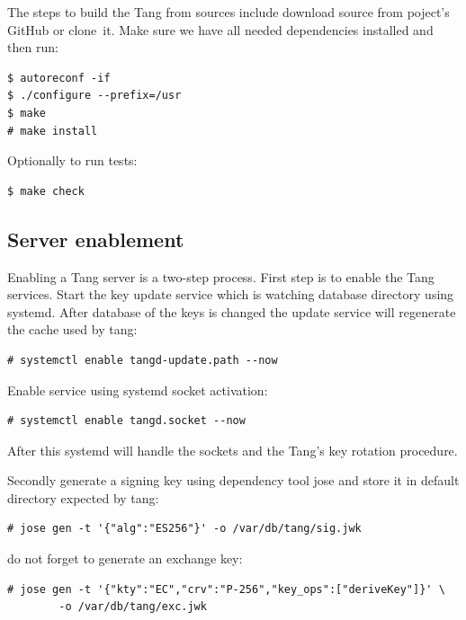 The steps to build the Tang from sources include download source from poject's GitHub or clone~it.
Make sure we have all needed dependencies installed and then run:
\begin{lstlisting}[columns=fixed,basicstyle=\ttfamily\footnotesize,tabsize=4,backgroundcolor=\color{yellow!10}]
$ autoreconf -if
$ ./configure --prefix=/usr
$ make
# make install
\end{lstlisting}
Optionally to run tests:
\begin{lstlisting}[columns=fixed,basicstyle=\ttfamily\footnotesize,tabsize=4,backgroundcolor=\color{yellow!10}]
$ make check
\end{lstlisting}



\subsection{Server enablement}

Enabling a Tang server is a two-step process.
First step is to enable the Tang services.
Start the key update service which is watching database directory using systemd.
After database of the keys is changed the update service will regenerate the cache used by tang:
\begin{lstlisting}[columns=fixed,basicstyle=\ttfamily\footnotesize,tabsize=4,backgroundcolor=\color{yellow!10}]
# systemctl enable tangd-update.path --now
\end{lstlisting}
Enable service using systemd socket activation:
\begin{lstlisting}[columns=fixed,basicstyle=\ttfamily\footnotesize,tabsize=4,backgroundcolor=\color{yellow!10}]
# systemctl enable tangd.socket --now
\end{lstlisting}
After this systemd will handle the sockets and the Tang's key rotation procedure.

Secondly generate a signing key using dependency tool jose and store it in default directory expected by tang:
\begin{lstlisting}[columns=fixed,basicstyle=\ttfamily\footnotesize,tabsize=4,backgroundcolor=\color{yellow!10}]
# jose gen -t '{"alg":"ES256"}' -o /var/db/tang/sig.jwk
\end{lstlisting}
do not forget to generate an exchange key:
\begin{lstlisting}[columns=fixed,basicstyle=\ttfamily\footnotesize,tabsize=4,backgroundcolor=\color{yellow!10}]
# jose gen -t '{"kty":"EC","crv":"P-256","key_ops":["deriveKey"]}' \
        -o /var/db/tang/exc.jwk
\end{lstlisting}

